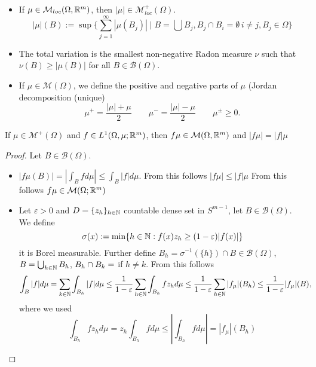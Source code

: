 \begin{remarks}
\begin{itemize}
\item If $\mu \in \mathcal{M}_{loc}(\Omega,\mathbb{R}^m)$, then $|\mu| \in
\mathcal{M}^+_{loc}(\Omega)$.
\[
|\mu|(B) := \sup \{\sum_{j=1} ^\infty |\mu(B_j)| \mid 
B= \bigcup B_j, B_j \cap B_i = \emptyset \, i\neq j, B_j \in \mathcal{\Omega}
\}
\]
\item The total variation is the smallest non-negative Radon measure $\nu$ such
that $\nu (B) \geq |\mu(B)|$ for all $B \in \mathcal{B}(\Omega)$.
\item If $\mu \in \mathcal{M}(\Omega)$, we define the positive and negative
parts of $\mu$ (Jordan decomposition (unique)
\[
\mu^+ = \frac{|\mu| + \mu}{2} \qquad 
\mu^- = \frac{|\mu| - \mu}{2} \qquad 
\mu^{\pm} \geq 0.
\]
\end{itemize}
\end{remarks}

\begin{lemma}
If $\mu \in \mathcal{M}^+(\Omega)$ and $f\in L^1(\Omega,\mu;\mathbb{R}^m)$, then $f\mu
\in \mathcal{M}(\Omega,\mathbb{R}^m)$ and $|f\mu| = |f|\mu$
\end{lemma}
\begin{proof}
Let $B \in \mathcal{B}(\Omega)$.
\begin{itemize}
\item $|f \mu(B)| = | \int_B f d\mu| \leq \int_B |f| d\mu$. From this follows
$|f\mu| \leq |f| \mu$ From this follows $f\mu \in \mathcal{M}(\Omega;\mathbb{R}^m)$ 
\item Let $\varepsilon > 0$ and $D = \{z_h\}_{h\in\mathbb{N}}$ countable dense set in
$S^{m-1}$, let $B \in \mathcal{B}(\Omega)$. We define 
\[
\sigma(x) := \min \{h\in \mathbb{N}: f(x) z_h \geq (1-\varepsilon)|f(x)|\}
\]
it is Borel measurable. Further define $B_h = \sigma^{-1}(\{h\}) \cap B \in
\mathcal{B}(\Omega)$, $B = \bigcup_{h\in\mathbb{N}} B_h$, $B_h \cap B_k = \empty$ if
$h\neq k$. From this follows
\[
\begin{aligned}
\int_B |f| d\mu 
&= \sum_{k\in\mathbb{N}} \int_{B_h} |f| d\mu 
\leq \frac{1}{1-\varepsilon} \sum_{h\in\mathbb{N}} \int_{B_h} f z_h d\mu 
\leq \frac{1}{1-\varepsilon} \sum_{h\in\mathbb{N}} |f_\mu|(B_h)  
\leq \frac{1}{1-\varepsilon}  |f_\mu|(B),
\end{aligned}
\]
where we used
\[
\int_{B_h} f z_h d\mu 
= z_h \int_{B_h} f d\mu 
\leq \left|\int_{B_h} f d\mu \right|
= |f_\mu|(B_h)  
\]
\end{itemize}
\end{proof}

